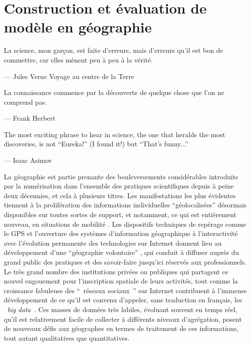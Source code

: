\graphicspath{{FigurePartie1/}}

\chapter{Construction et évaluation de modèle en géographie}

\startcontents[chapters]
\Mprintcontents


\epigraph {La science, mon garçon, est faite d’erreurs, mais d’erreurs qu’il est bon de commettre, car elles mènent peu à peu à la vérité.} { --- \textup{Jules Verne} Voyage au centre de la Terre} 

\epigraph {La connaissance commence par la découverte de quelque chose que l'on ne comprend pas.  } { --- \textup{Frank Herbert}}

\epigraph {The most exciting phrase to hear in science, the one that heralds the most discoveries, is not \enquote{Eureka!} (I found it!) but \enquote{That's funny...} } { --- \textup{Isaac Asimov} } 

\pagebreak



La géographie est partie prenante des bouleversements considérables introduits par la numérisation dans l’ensemble des pratiques scientifiques depuis à peine deux décennies, et cela à plusieurs titres. Les manifestations les plus évidentes tiennent à la prolifération des informations individuelles \enquote{géolocalisées} désormais disponibles sur toutes sortes de support, et notamment, ce qui est entièrement nouveau, en situations de mobilité \autocite{FenChong2012}. Les dispositifs techniques de repérage comme le GPS et l’ouverture des systèmes d’information géographique à l’interactivité avec l'évolution permanente des technologies sur Internet donnent lieu au développement d’une \enquote{géographie volontaire} \autocite{Goodchild2007}, qui conduit à diffuser auprès du grand public des pratiques et des savoir-faire jusqu’ici réservés aux professionnels. Le très grand nombre des institutions privées ou publiques qui partagent ce nouvel engouement pour l’inscription spatiale de leurs activités, tout comme la croissance fabuleuse des \enquote{ réseaux sociaux } sur Internet  contribuent à l’immense développement de ce qu’il est convenu d’appeler, sans traduction en français, les \textit{ big data }. Ces masses de données très labiles, évoluant souvent en temps réel, qu’il est relativement facile de collecter à différents niveaux d’agrégation, posent de nouveaux défis aux géographes en termes de traitement de ces informations, tout autant qualitatives que quantitatives.

